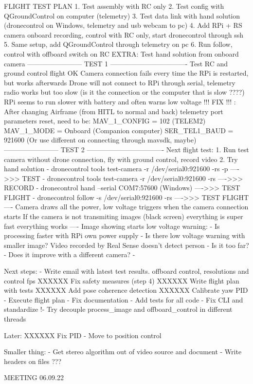 FLIGHT TEST PLAN
1. Test assembly with RC only
2. Test config with QGroundControl on computer (telemetry)
3. Test data link with hand solution (dronecontrol on Windows, telemetry and usb webcam to pc)
4. Add RPi + RS camera onboard recording, control with RC only, start dronecontrol through ssh
5. Same setup, add QGroundControl through telemetry on pc
6. Run follow, control with offboard switch on RC
EXTRA: Test hand solution from onboard camera
------------------------    TEST 1   ----------------------------------
Test RC and ground control flight OK
Camera connection fails every time the RPi is restarted, but works afterwards
Drone will not connect to RPi through serial, telemetry radio works but too slow (is it the connection or the computer that is slow ????)
RPi seems to run slower with battery and often warns low voltage
!!! FIX !!! : After changing Airframe (from HITL to normal and back) telemetry port parameters reset, need to be: 
MAV_1_CONFIG = 102 (TELEM2)
MAV_1_MODE = Onboard (Companion computer)
SER_TEL1_BAUD = 921600 (Or use different on connecting through mavsdk, maybe)
------------------------    TEST 2   ----------------------------------
Next flight test:
1. Run test camera without drone connection, fly with ground control, record video
2. Try hand solution
- dronecontrol tools test-camera -r /dev/serial0:921600 -rs -p   ---->>> TEST
- dronecontrol tools test-camera -r /dev/serial0:921600 -rs      ---->>> RECORD
- dronecontrol hand --serial COM7:57600 (Windows)                ---->>> TEST FLIGHT
- dronecontrol follow -s /dev/serial0:921600 -rs                 ---->>> TEST FLIGHT
----
Camera draws all the power, low voltage triggers when the camera connection starts
If the camera is  not transmiting images  (black screen) everything is super fast everything works
----
Image showing starts low voltage warning:
- Is processing faster with RPi own power supply
- Is there low voltage warning with smaller image?
Video recorded by Real Sense doesn't detect person
- Is it too far?
- Does it improve with a different camera?
- 


Next steps:
 - Write email with latest test results. offboard control, resolutions and control fps
 XXXXXX Fix safety measures (step 4)
 XXXXXX Write flight plan with tests
 XXXXXX Add pose coherence detection
 XXXXXX Calibrate yaw PID
 - Execute flight plan
 - Fix documentation
 - Add tests for all code
 - Fix CLI and standardize 
 !- Try decouple process_image and offboard_control in different threads
 
Later:
 XXXXXX Fix PID
 - Move to position control
 
 Smaller thing:
  - Get stereo algorithm out of video source and document
  - Write headers on files ???
  
  
  
  
  
MEETING 06.09.22



  